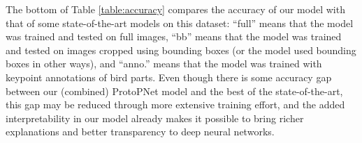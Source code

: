 \documentclass{article}
\theoremstyle{definition}
\theoremstyle{remark}
\begin{document}
The bottom of Table \ref{table:accuracy} compares the accuracy of our model with that of some state-of-the-art models on this dataset: ``full'' means that the model was trained and tested on full images, ``bb'' means that the model was trained and tested on images cropped using bounding boxes (or the model used bounding boxes in other ways), and ``anno.'' means that the model was trained with keypoint annotations of bird parts. Even though there is some accuracy gap between our (combined) ProtoPNet model and the best of the state-of-the-art, this gap may be reduced through more extensive training effort, and the added interpretability in our model already makes it possible to bring richer explanations and better transparency to deep neural networks.

\end{document}
